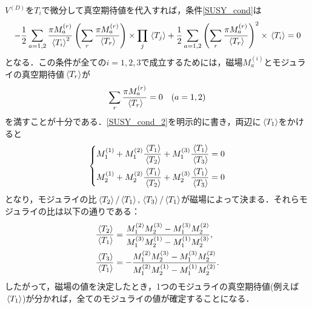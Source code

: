 \documentclass[a4paper,uplatex,dvipdfmx,10pt]{jsarticle}
\theoremstyle{definition}
\begin{document}
$V^{(D)}$を$T_{i}$で微分して真空期待値を代入すれば，条件\eqref{SUSY_cond}は
\begin{equation}
   -
   \frac{1}{2}\sum_{a=1,2}
   \frac{\pi M_{a}^{(r)}}{\ev*{T_{i}}^{2}}
   \left(  
      \sum_{r}\frac{\pi M_{a}^{(r)}}{\ev*{T_{r}}}
   \right)
   \times
   \prod_{j}
   \ev*{T_{j}}
   +
   \frac{1}{2}
   \sum_{a=1,2}
   \left(  
      \sum_{r}\frac{\pi M_{a}^{(r)}}{\ev*{T_{r}}}
   \right)^2
   \times
   \ev*{T_{i}}
   =
   0
   \nonumber
\end{equation}
となる．この条件が全ての$i=1,2,3$で成立するためには，磁場$M_{a}^{(i)}$とモジュライの真空期待値$\ev*{T_{r}}$が
\begin{equation}
   \sum_{r}\frac{\pi M_{a}^{(r)}}{\ev*{T_{r}}}
   =
   0
   \quad
   (a=1,2)   
   \label{SUSY_cond_2}
\end{equation}
を満すことが十分である．\eqref{SUSY_cond_2}を明示的に書き，両辺に$\ev*{T_{1}}$をかけると
\begin{equation}
   \left\{
      \begin{alignedat}{1}
         M_{1}^{(1)}
         +
         M_{1}^{(2)}\frac{\ev*{T_{1}}}{\ev*{T_{2}}}
         +
         M_{1}^{(3)}\frac{\ev*{T_{1}}}{\ev*{T_{3}}}
         &=
         0
         \\
         M_{2}^{(1)}
         +
         M_{2}^{(2)}\frac{\ev*{T_{1}}}{\ev*{T_{2}}}
         +
         M_{2}^{(3)}\frac{\ev*{T_{1}}}{\ev*{T_{3}}}
         &=
         0
      \end{alignedat}
   \right.
   \nonumber
\end{equation}
となり，モジュライの比$\ev*{T_{2}}/\ev*{T_{1}},\ev*{T_{3}}/\ev*{T_{1}}$が磁場によって決まる．それらモジュライの比は以下の通りである：
\begin{align}
   \frac{\ev*{T_{2}}}{\ev*{T_{1}}}
   &=
   \frac{ M_{1}^{(2)} M_{2}^{(3)}- M_{1}^{(3)} M_{2}^{(2)}}{M_{1}^{(3)} M_{2}^{(1)}-M_{1}^{(1)} M_{2}^{(3)}}
   ,
   \label{torus_area_ratio1}
   \\
   \frac{\ev*{T_{3}}}{\ev*{T_{1}}}
   &=
   -\frac{ M_{1}^{(2)} M_{2}^{(3)}-M_{1}^{(3)} M_{2}^{(2)}}{M_{1}^{(2)} M_{2}^{(1)}-M_{1}^{(1)} M_{2}^{(2)}}
   .
   \label{torus_area_ratio2}
\end{align}
したがって，磁場の値を決定したとき，1つのモジュライの真空期待値(例えば$\ev*{T_{1}}$)が分かれば，全てのモジュライの値が確定することになる．
\end{document}
